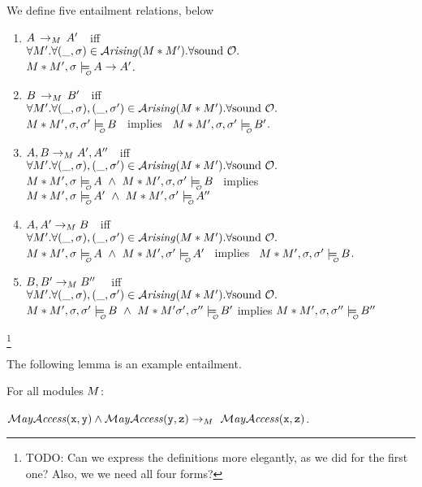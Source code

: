 \begin{definition}[Entailment]
\label{def:entail}
We define five entailment relations, below

\begin{enumerate}
\item
\label{entailPP}
$A\, \rightarrow_{M}\, A'$\ \  iff\ \\
$\forall   M'. \forall (\_,\sigma)\in {\mathcal{A}}\textrm{\textit{rising}}(M*M').{\forall \mbox{sound}\ {\cal O}.}$\\
 $\M*\M', \sigma \modelsWithO    \A \rightarrow  \A'$.
\item
\label{entailQQ}
$B\, \rightarrow_{M}\, B'$\ \  iff\ \\
$\forall   \M'. \forall (\_,\sigma),(\_,\sigma')\in \Arising(\M*\M').\forall \mbox{sound}\ \O.$\\
$\M*\M', \sigma, \sigma' \modelsWithO    {\B}$ \ implies \   $\M*\M', \sigma, \sigma' \modelsWithO    \B'$.
\item
\label{entailPQPP}
$A, B \rightarrow_{M} A',A''$\ \  iff\ \\
$\forall   \M'. \forall (\_,\sigma),(\_,\sigma')\in \Arising(\M*\M').{\forall \mbox{sound}\ \O.}$\\
$\M*\M', \sigma\modelsWithO   \A\ \wedge\ \M*\M', \sigma,\sigma' \modelsWithO   \B $ \
implies \ $ \M*\M',\sigma \modelsWithO   \A' \ \wedge\   \M*\M',\sigma' \modelsWithO   \A''$
\item
\label{entailPPQ}
$A, A' \rightarrow_{M} B$\ \  iff\ \\
$\forall   \M'. \forall (\_,\sigma),(\_,\sigma')\in \Arising(\M*\M').{\forall \mbox{sound}\ \O.}$\\
$\M*\M',\sigma\modelsWithO   \A\ \wedge\  \M*\M',\sigma' \modelsWithO   \A'$ \ implies \ $\M*\M',\sigma,\sigma' \modelsWithO   \B$.
\item
\label{entailQQQ}
$B, B' \rightarrow_{M} B''$ \ \  iff\ \\
$\forall   \M'. \forall (\_,\sigma),(\_,\sigma')\in \Arising(\M*\M').{\forall \mbox{sound}\ \O.}$\\
$\M*\M',\sigma,\sigma' \modelsWithO   \B\ \wedge\   \M*\M'\sigma',\sigma'' \modelsWithO   \B'$ implies $\M*\M',\sigma,\sigma'' \modelsWithO   \B''$
\end{enumerate}
\end{definition}

\footnote{TODO: Can we express the definitions more elegantly, as we did for the first one? Also, we we need all four forms?}

The following lemma is an example entailment.
\begin{lemma} For all modules $M$:
$ ~ $

\noindent$ \MayAccess(\prg{x},\prg{y}) \wedge \MayAccess({\prg{y},\prg{z}})  \rightarrow_{\M} \ \MayAccess(\prg{x},\prg{z}) $.

\end{lemma}


